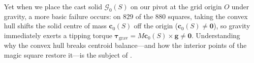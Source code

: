Yet when we place the cast solid $\mathcal G_0(S)$ on our pivot at the grid origin $O$ under gravity, a more basic failure occurs: on $829$ of the $880$ squares, taking the convex hull shifts the solid centre of mass $\mathbf c_0(S)$ off the origin ($\mathbf c_0(S)\ne\mathbf 0$), so gravity immediately exerts a tipping torque $\boldsymbol\tau_{\mathrm{grav}}=M\mathbf c_0(S)\times\mathbf g\ne\mathbf 0$. Understanding why the convex hull breaks centroid balance—and how the interior points of the magic square restore it—is the subject of .
